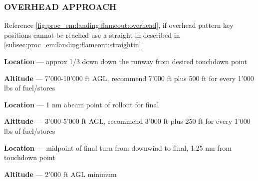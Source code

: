 \subsubsection{OVERHEAD APPROACH}

\begin{tcoloritemize}
    Reference \cref{fig:proc_em:landing:flameout:overhead}, 
    if overhead pattern key positions cannot be reached use a straight-in 
    described in \cref{subsec:proc_em:landing:flameout:straightin}

    \textbf{Location} --- approx {1/3 down down the runway} from desired touchdown point

    \bigskip
    \textbf{Altitude} --- {7'000-10'000 ft AGL},
    recommend 7'000 ft plus 500 ft for every 1'000 lbs of fuel/stores

    \textbf{Location} --- {1 nm abeam} point of rollout for final 

    \bigskip
    \textbf{Altitude} --- {3'000-5'000 ft AGL},
    recommend 3'000 ft plus 250 ft for every 1'000 lbs of fuel/stores

    \textbf{Location} --- midpoint of final turn from downwind to final,
    {1.25 nm from touchdown point}

    \bigskip
    \textbf{Altitude} --- {2'000 ft AGL minimum}
\end{tcoloritemize}


